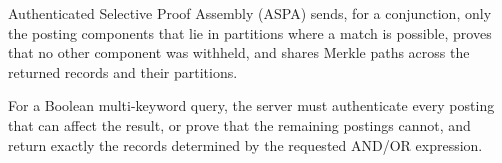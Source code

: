 


Authenticated Selective Proof Assembly (ASPA) sends, for a conjunction, only the posting components
that lie in partitions where a match is possible, proves that no other component was withheld, and
shares Merkle paths across the returned records and their partitions.




For a Boolean multi-keyword query, the server must authenticate every posting that can affect the
result, or prove that the remaining postings cannot, and return exactly the records determined by the
requested AND/OR expression.



